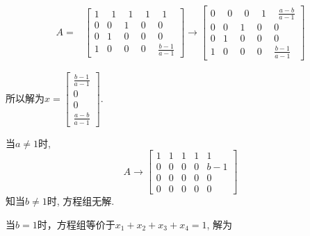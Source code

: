 \documentclass[a4paper]{book}
\begin{document}
\begin{displaymath}
\begin{aligned}
A=&\begin{bmatrix} 1&\ \ 1&\ \ 1&\ \ 1&\ \ 1\\0&0&1&0&0\\0&1&0&0&0\\1&0&0&0&\frac{b-1}{a-1} \end{bmatrix}\rightarrow
\begin{bmatrix}0&\ \ 0&\ \ 0& \ \ 1&\ \ \frac{a-b}{a-1}\\0&0&1&0&0\\0&1&0&0&0\\1&0&0&0&\frac{b-1}{a-1}  \end{bmatrix} \end{aligned} \end{displaymath}

所以解为$x=\begin{bmatrix}\frac{b-1}{a-1}\\0\\0\\ \frac{a-b}{a-1}\end{bmatrix}.$

当$a\not=1$时, $$A\rightarrow \begin{bmatrix}1&1&1&1&1\\0&0&0&0&b-1\\0&0&0&0&0\\0&0&0&0&0\end{bmatrix}$$
知当$b\not=1$时, 方程组无解.

当$b=1$时，方程组等价于$x_1+x_2+x_3+x_4=1$, 解为
\end{document}
